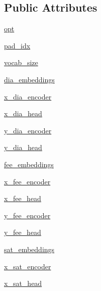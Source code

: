 \subsection*{Public Attributes}
\begin{DoxyCompactItemize}
\item 
\hyperlink{classself__feeding_1_1modules_1_1SelfFeedingModel_ad755fa0599d25f8b953de711995116ef}{opt}
\item 
\hyperlink{classself__feeding_1_1modules_1_1SelfFeedingModel_aa6989e0f40e11a126e49e34eb9eaf238}{pad\+\_\+idx}
\item 
\hyperlink{classself__feeding_1_1modules_1_1SelfFeedingModel_a2d5b31bb1e75b23afb3d9d2ecf4fc436}{vocab\+\_\+size}
\item 
\hyperlink{classself__feeding_1_1modules_1_1SelfFeedingModel_a92f3058f48c0d51bbd553651442bd073}{dia\+\_\+embeddings}
\item 
\hyperlink{classself__feeding_1_1modules_1_1SelfFeedingModel_adf25e0bce4a71b69ade9dbc212784fa7}{x\+\_\+dia\+\_\+encoder}
\item 
\hyperlink{classself__feeding_1_1modules_1_1SelfFeedingModel_afd72526459e6d3ea01c31aa2ceb57292}{x\+\_\+dia\+\_\+head}
\item 
\hyperlink{classself__feeding_1_1modules_1_1SelfFeedingModel_ac8ce734fde9fb3ec280aad69eb07cdca}{y\+\_\+dia\+\_\+encoder}
\item 
\hyperlink{classself__feeding_1_1modules_1_1SelfFeedingModel_ad0774b17a58fd486b89d107d09eb96cc}{y\+\_\+dia\+\_\+head}
\item 
\hyperlink{classself__feeding_1_1modules_1_1SelfFeedingModel_a15b26965579be3d43221da139f273cdc}{fee\+\_\+embeddings}
\item 
\hyperlink{classself__feeding_1_1modules_1_1SelfFeedingModel_a93e6c8769d16de594fe973ad7960dc98}{x\+\_\+fee\+\_\+encoder}
\item 
\hyperlink{classself__feeding_1_1modules_1_1SelfFeedingModel_a41612d52bdf95036036964e262acfcd6}{x\+\_\+fee\+\_\+head}
\item 
\hyperlink{classself__feeding_1_1modules_1_1SelfFeedingModel_a6b5fddf8b9c535961a9164727203d33d}{y\+\_\+fee\+\_\+encoder}
\item 
\hyperlink{classself__feeding_1_1modules_1_1SelfFeedingModel_a020de90b88c77e3fb2cfe1fd3d5930f8}{y\+\_\+fee\+\_\+head}
\item 
\hyperlink{classself__feeding_1_1modules_1_1SelfFeedingModel_a75d7ed45fc02845cb1eb5c062c51f181}{sat\+\_\+embeddings}
\item 
\hyperlink{classself__feeding_1_1modules_1_1SelfFeedingModel_a82fc3d50ccbfa3f763a1871902f46580}{x\+\_\+sat\+\_\+encoder}
\item 
\hyperlink{classself__feeding_1_1modules_1_1SelfFeedingModel_ab88c40865d17ecfed84573453bd2eb53}{x\+\_\+sat\+\_\+head}
\end{DoxyCompactItemize}


